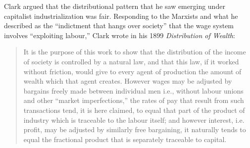 Clark argued that the distributional pattern that he saw emerging under capitalist industrialization was fair. Responding to the Marxists and what he described as the ``indictment that hangs over society'' that the wage system involves ``exploiting labour,'' Clark wrote in his 1899 \textit{Distribution of Wealth}:
\begin{quotation}
\noindent It is the purpose of this work to show that the distribution of the income of society is controlled by a natural law, and that this law, if it worked without friction, would give to every agent of production the amount of wealth which that agent creates. However wages may be adjusted by bargains freely made between individual men i.e., without labour unions and other ``market imperfections,'' the rates of pay that result from such transactions tend, it is here claimed, to equal that part of the product of industry which is traceable to the labour itself; and however interest, i.e. profit, may be adjusted by similarly free bargaining, it naturally tends to equal the fractional product that is separately traceable to capital.
\end{quotation}
